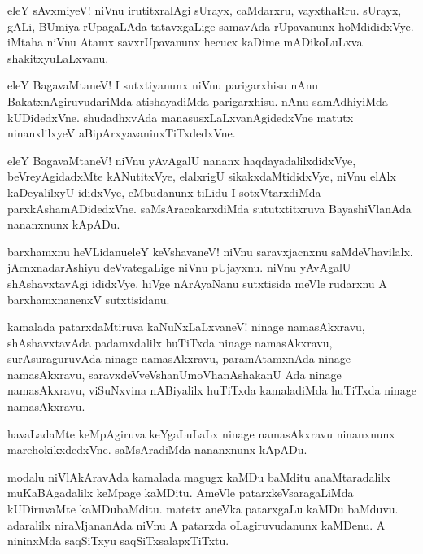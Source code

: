 \begin{mng}
eleY sAvxmiyeV! niVnu irutitxralAgi sUrayx, caMdarxru, vayxthaRru. sUrayx, gALi, BUmiya rUpagaLAda tatavxgaLige samavAda rUpavanunx hoMdididxVye. iMtaha niVnu Atamx savxrUpavanunx hecucx kaDime mADikoLuLxva shakitxyuLaLxvanu.
\end{mng}

\begin{mng}
eleY BagavaMtaneV! I sutxtiyanunx niVnu parigarxhisu nAnu BakatxnAgiruvudariMda atishayadiMda parigarxhisu. nAnu samAdhiyiMda kUDidedxVne. shudadhxvAda manasusxLaLxvanAgidedxVne matutx ninanxlilxyeV aBipArxyavaninxTiTxdedxVne.
\end{mng}

\begin{mng}
eleY BagavaMtaneV! niVnu yAvAgalU nananx haqdayadalilxdidxVye, beVreyAgidadxMte kANutitxVye, elalxrigU sikakxdaMtididxVye, niVnu elAlx kaDeyalilxyU ididxVye, eMbudanunx tiLidu I sotxVtarxdiMda parxkAshamADidedxVne. saMsAracakarxdiMda sututxtitxruva BayashiVlanAda nananxnunx kApADu.
\end{mng}

\begin{mng}
barxhamxnu heVLidanu\mdash eleY keVshavaneV! niVnu saravxjacnxnu saMdeVhavilalx. jAcnxnadarAshiyu deVvategaLige niVnu pUjayxnu. niVnu yAvAgalU shAshavxtavAgi ididxVye. hiVge nArAyaNanu sutxtisida meVle rudarxnu A barxhamxnanenxV sutxtisidanu.
\end{mng}

\begin{mng}
kamalada patarxdaMtiruva kaNuNxLaLxvaneV! ninage namasAkxravu, shAshavxtavAda padamxdalilx huTiTxda ninage namasAkxravu, surAsuraguruvAda ninage namasAkxravu, paramAtamxnAda ninage namasAkxravu, saravxdeVveVshanUmoVhanAshakanU Ada ninage namasAkxravu, viSuNxvina nABiyalilx huTiTxda kamaladiMda huTiTxda ninage namasAkxravu.
\end{mng}

\begin{mng}
havaLadaMte keMpAgiruva keYgaLuLaLx ninage namasAkxravu ninanxnunx marehokikxdedxVne. saMsAradiMda nananxnunx kApADu.
\end{mng}

\begin{mng}
modalu niVlAkAravAda kamalada magugx kaMDu baMditu anaMtaradalilx muKaBAgadalilx keMpage kaMDitu. AmeVle patarxkeVsaragaLiMda kUDiruvaMte kaMDubaMditu. matetx aneVka patarxgaLu kaMDu baMduvu. adaralilx niraMjananAda niVnu A patarxda oLagiruvudanunx kaMDenu. A nininxMda saqSiTxyu saqSiTxsalapxTiTxtu.
\end{mng}

